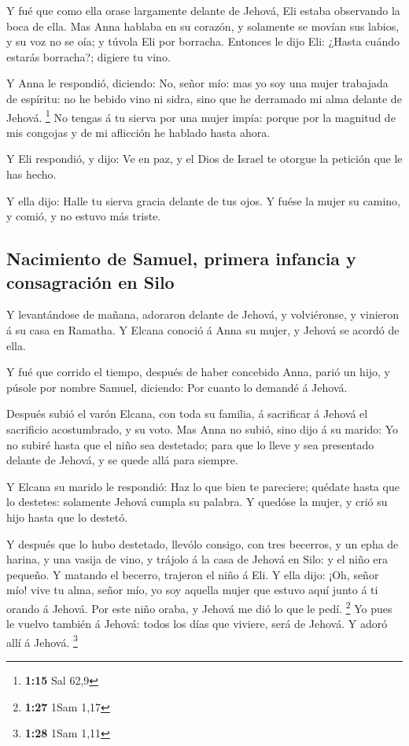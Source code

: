  Y fué que como ella orase largamente delante de Jehová,
Eli estaba observando la boca de ella.  Mas Anna hablaba
en su corazón, y solamente se movían sus labios, y su voz no se oía; y
túvola Eli por borracha.  Entonces le dijo Eli: ¿Hasta
cuándo estarás borracha?; digiere tu vino.

 Y Anna le respondió, diciendo: No, señor mío: mas yo soy
una mujer trabajada de espíritu: no he bebido vino ni sidra, sino que he
derramado mi alma delante de Jehová. \footnote{\textbf{1:15} Sal 62,9}
 No tengas á tu sierva por una mujer impía: porque por la
magnitud de mis congojas y de mi aflicción he hablado hasta ahora.

 Y Eli respondió, y dijo: Ve en paz, y el Dios de Israel
te otorgue la petición que le has hecho.

 Y ella dijo: Halle tu sierva gracia delante de tus ojos.
Y fuése la mujer su camino, y comió, y no estuvo más triste.

\hypertarget{nacimiento-de-samuel-primera-infancia-y-consagraciuxf3n-en-silo}{%
\subsection{Nacimiento de Samuel, primera infancia y consagración en
Silo}\label{nacimiento-de-samuel-primera-infancia-y-consagraciuxf3n-en-silo}}

 Y levantándose de mañana, adoraron delante de Jehová, y
volviéronse, y vinieron á su casa en Ramatha. Y Elcana conoció á Anna su
mujer, y Jehová se acordó de ella.

 Y fué que corrido el tiempo, después de haber concebido
Anna, parió un hijo, y púsole por nombre Samuel, diciendo: Por cuanto lo
demandé á Jehová.

 Después subió el varón Elcana, con toda su familia, á
sacrificar á Jehová el sacrificio acostumbrado, y su voto.
 Mas Anna no subió, sino dijo á su marido: Yo no subiré
hasta que el niño sea destetado; para que lo lleve y sea presentado
delante de Jehová, y se quede allá para siempre.

 Y Elcana su marido le respondió: Haz lo que bien te
pareciere; quédate hasta que lo destetes: solamente Jehová cumpla su
palabra. Y quedóse la mujer, y crió su hijo hasta que lo destetó.

 Y después que lo hubo destetado, llevólo consigo, con
tres becerros, y un epha de harina, y una vasija de vino, y trájolo á la
casa de Jehová en Silo: y el niño era pequeño.  Y matando
el becerro, trajeron el niño á Eli.  Y ella dijo: ¡Oh,
señor mío! vive tu alma, señor mío, yo soy aquella mujer que estuvo aquí
junto á ti orando á Jehová.  Por este niño oraba, y
Jehová me dió lo que le pedí. \footnote{\textbf{1:27} 1Sam 1,17}
 Yo pues le vuelvo también á Jehová: todos los días que
viviere, será de Jehová. Y adoró allí á Jehová. \footnote{\textbf{1:28}
  1Sam 1,11}

